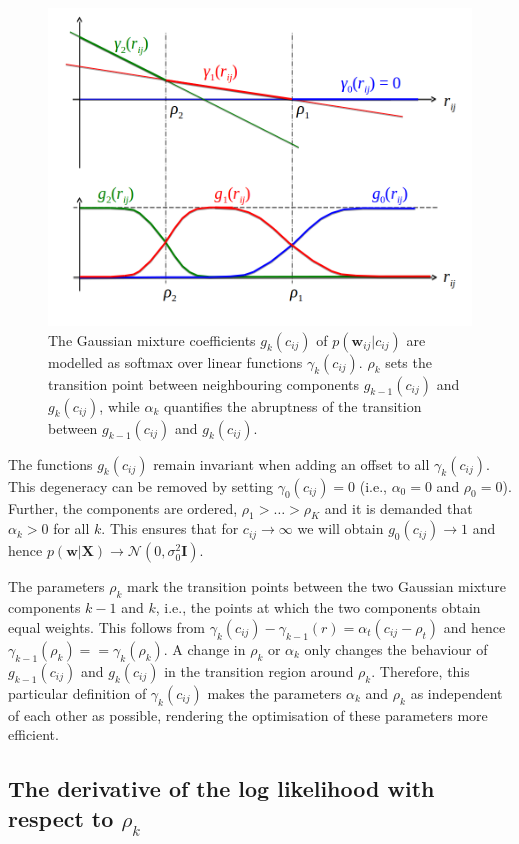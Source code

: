 \documentclass[11pt,a4paper,twoside]{book}
\newcommand{\eq}{\!=\!}
\newcommand{\Gauss}{\mathcal{N}}
\newcommand{\I}{\mathbf{I}}
\newcommand{\cij}{c_{ij}}
\newcommand{\w}{\mathbf{w}}
\newcommand{\wij}{\mathbf{w}_{ij}}
\newcommand{\X}{\mathbf{X}}
\theoremstyle{definition}
\theoremstyle{definition}
\theoremstyle{remark}
\begin{document}
\begin{figure}

{\centering \includegraphics[width=0.5\linewidth]{img/theory/softmax_linear_fct} 

}

\caption{The Gaussian mixture coefficients
\(g_k(\cij)\) of \(p(\wij|\cij)\) are modelled as softmax over linear
functions \(\gamma_k(\cij)\). \(\rho_k\) sets the transition point
between neighbouring components \(g_{k-1}(\cij)\) and \(g_k(\cij)\),
while \(\alpha_k\) quantifies the abruptness of the transition between
\(g_{k-1}(\cij)\) and \(g_k(\cij)\).}\label{fig:softmax-linear-fct}
\end{figure}

The functions \(g_k(\cij)\) remain invariant when adding an offset to
all \(\gamma_k(\cij)\). This degeneracy can be removed by setting
\(\gamma_0(\cij) \eq 0\) (i.e., \(\alpha_0 \eq 0\) and
\(\rho_0 \eq 0\)). Further, the components are ordered,
\(\rho_1> \ldots > \rho_K\) and it is demanded that \(\alpha_k > 0\) for
all \(k\). This ensures that for \(\cij \rightarrow \infty\) we will
obtain \(g_0(\cij) \rightarrow 1\) and hence
\(p(\w | \X) \rightarrow \Gauss(0, \sigma_0^2 \I )\).

The parameters \(\rho_k\) mark the transition points between the two
Gaussian mixture components \(k-1\) and \(k\), i.e., the points at which
the two components obtain equal weights. This follows from
\(\gamma_k(\cij) - \gamma_{k-1}(r) \eq \alpha_{t} ( \cij - \rho_{t})\)
and hence \(\gamma_{k-1}(\rho_k) \eq= \gamma_k(\rho_k)\). A change in
\(\rho_k\) or \(\alpha_k\) only changes the behaviour of
\(g_{k-1}(\cij)\) and \(g_k(\cij)\) in the transition region around
\(\rho_k\). Therefore, this particular definition of \(\gamma_k(\cij)\)
makes the parameters \(\alpha_k\) and \(\rho_k\) as independent of each
other as possible, rendering the optimisation of these parameters more
efficient.

\subsection{\texorpdfstring{The derivative of the log likelihood with
respect to
\(\rho_k\)}{The derivative of the log likelihood with respect to \textbackslash{}rho\_k}}\label{the-derivative-of-the-log-likelihood-with-respect-to-rho_k}
\end{document}
